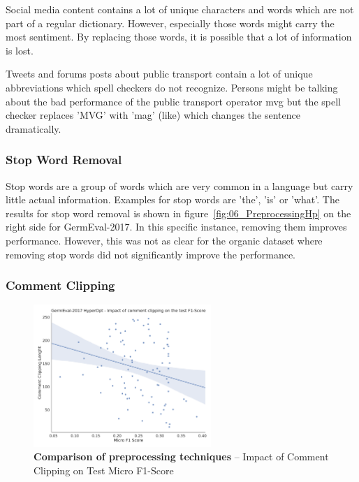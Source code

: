 Social media content contains a lot of unique characters and words which are not part of a regular dictionary. However, especially those words might carry the most sentiment. By replacing those words, it is possible that a lot of information is lost.
\medskip

Tweets and forums posts about public transport contain a lot of unique abbreviations which spell checkers do not recognize. Persons might be talking about the bad performance of the public transport operator \gls{mvg} but the spell checker replaces 'MVG' with 'mag' {(like)} which changes the sentence dramatically.

\subsubsection{Stop Word Removal}

Stop words are a group of words which are very common in a language but carry little actual information. Examples for stop words are 'the', 'is' or 'what'. The results for stop word removal is shown in figure~\ref{fig:06_PreprocessingHp} on the right side for GermEval-2017. In this specific instance, removing them improves performance. However, this was not as clear for the organic dataset where removing stop words did not significantly improve the performance.

\subsubsection{Comment Clipping}
\label{subsec:06_CommentClipping}

\begin{figure}[htb]
    \centering
    \includegraphics[width=0.6\textwidth]{figures/06_results/06_hp_ge_lm_commentClipping_test}
    \caption{\textbf{Comparison of preprocessing techniques} -- Impact of Comment Clipping on Test Micro F1-Score}
    \label{fig:06_PreprocessingCommentClipping}
\end{figure}

